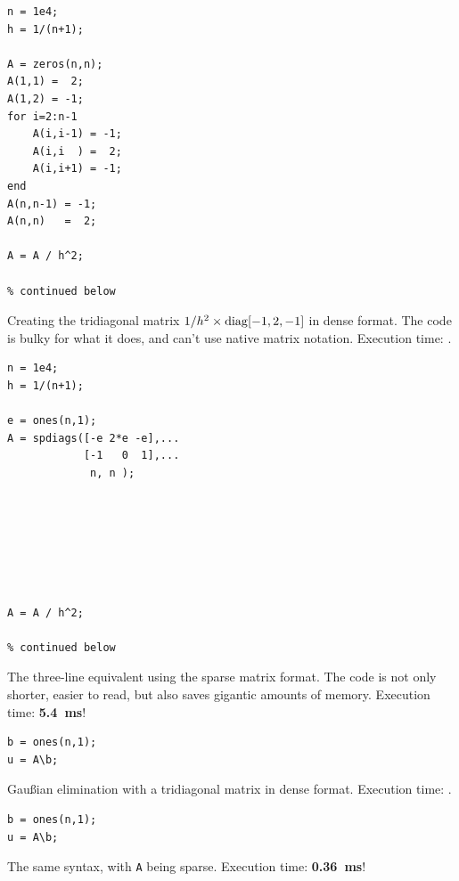 \hfill
\begin{minipage}[t]{.45\textwidth}
\begin{lstlisting}[framerule=2pt,rulecolor=\color{badred}]
n = 1e4;
h = 1/(n+1);

A = zeros(n,n);
A(1,1) =  2;
A(1,2) = -1;
for i=2:n-1
    A(i,i-1) = -1;
    A(i,i  ) =  2;
    A(i,i+1) = -1;
end
A(n,n-1) = -1;
A(n,n)   =  2;

A = A / h^2;

% continued below
\end{lstlisting}
Creating the tridiagonal matrix $1/h^2\times\operatorname{diag}[-1, 2, -1]$ in dense format. The code is bulky for what it does, and can't use native matrix notation. Execution time: .
\end{minipage}
\hfill
\begin{minipage}[t]{.45\textwidth}
\begin{lstlisting}[framerule=2pt,rulecolor=\color{goodgreen}]
n = 1e4;
h = 1/(n+1);

e = ones(n,1);
A = spdiags([-e 2*e -e],...
            [-1   0  1],...
             n, n );







A = A / h^2;

% continued below
\end{lstlisting}
The three-line equivalent using the sparse matrix format. The code is not only shorter, easier to read, but also saves gigantic amounts of memory. Execution time: \textbf{\SI{5.4}{\milli\second}}!
\end{minipage}
\hfill

\medskip

\hfill
\begin{minipage}[t]{.45\textwidth}
\begin{lstlisting}[framerule=2pt,rulecolor=\color{badred}]
% A in dense format
b = ones(n,1);
u = A\b;
\end{lstlisting}
Gau{\ss}ian elimination with a tridiagonal matrix in dense format. Execution time: .
\end{minipage}
\hfill
\begin{minipage}[t]{.45\textwidth}
\begin{lstlisting}[framerule=2pt,rulecolor=\color{goodgreen}]
% A in sparse format
b = ones(n,1);
u = A\b;
\end{lstlisting}
The same syntax, with \lstinline!A! being sparse. Execution time: \textbf{\SI{0.36}{\milli\second}}!
\end{minipage}
\hfill

